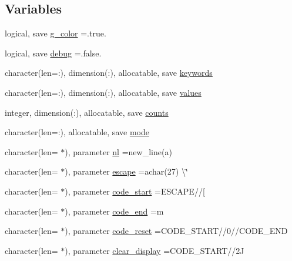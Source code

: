 \subsection*{Variables}
\begin{DoxyCompactItemize}
\item 
logical, save \mbox{\hyperlink{namespacem__escape_a67ff4e5b90da8436f0da5882c4a5720c}{g\+\_\+color}} =.true.
\item 
logical, save \mbox{\hyperlink{namespacem__escape_af068eb2561159352a9a406c95157b131}{debug}} =.false.
\item 
character(len=\+:), dimension(\+:), allocatable, save \mbox{\hyperlink{namespacem__escape_a35e957e007844dbfe641b3d915fba048}{keywords}}
\item 
character(len=\+:), dimension(\+:), allocatable, save \mbox{\hyperlink{namespacem__escape_a4c3b430bde66148e6f2c79c5418384fa}{values}}
\item 
integer, dimension(\+:), allocatable, save \mbox{\hyperlink{namespacem__escape_a7e8e011813de1e58d7c8bcda489d8f1c}{counts}}
\item 
character(len=\+:), allocatable, save \mbox{\hyperlink{namespacem__escape_ab4e7fcb41457772a9bd4e4413d5355d6}{mode}}
\item 
character(len= $\ast$), parameter \mbox{\hyperlink{namespacem__escape_aa17be0f87e5ec9012a38c04bfbb5e588}{nl}} =new\+\_\+line(\textquotesingle{}a\textquotesingle{})
\item 
character(len= $\ast$), parameter \mbox{\hyperlink{namespacem__escape_a9931f535eb0f6f24df5a121331faa5ef}{escape}} =achar(27) \textbackslash{}\char`\"{}
\item 
character(len= $\ast$), parameter \mbox{\hyperlink{namespacem__escape_a6d5af6b1571cba22511523c53c71fa6f}{code\+\_\+start}} =E\+S\+C\+A\+PE//\textquotesingle{}\mbox{[}\textquotesingle{}
\item 
character(len= $\ast$), parameter \mbox{\hyperlink{namespacem__escape_af913c326395b9bf2c089c30698d2c742}{code\+\_\+end}} =\textquotesingle{}m\textquotesingle{}
\item 
character(len= $\ast$), parameter \mbox{\hyperlink{namespacem__escape_aaaf7224f2104dcd571cdaa69b61b9d01}{code\+\_\+reset}} =C\+O\+D\+E\+\_\+\+S\+T\+A\+RT//\textquotesingle{}0\textquotesingle{}//C\+O\+D\+E\+\_\+\+E\+ND
\item 
character(len= $\ast$), parameter \mbox{\hyperlink{namespacem__escape_a9d45e30ea5891b89dc9a61ba1b5dbc03}{clear\+\_\+display}} =C\+O\+D\+E\+\_\+\+S\+T\+A\+RT//\textquotesingle{}2\+J\textquotesingle{}

\end{DoxyCompactItemize}

